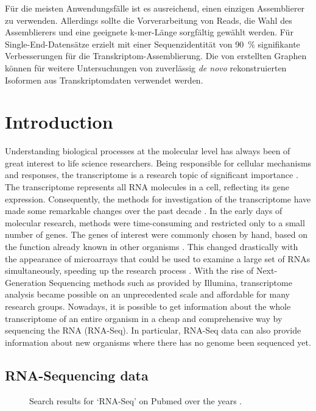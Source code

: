 \documentclass[12pt,a4paper,english]{article}
\begin{document}
	Für die meisten Anwendungsfälle ist es ausreichend, einen einzigen Assemblierer zu verwenden. Allerdings sollte die Vorverarbeitung von Reads, die Wahl des Assemblierers und eine geeignete k-mer-Länge sorgfältig gewählt werden. Für Single-End-Datensätze erzielt \cdhit mit einer Sequenzidentität von 90~\% signifikante Verbesserungen für die Transkriptom-Assemblierung.
	Die von \karma erstellten Graphen können für weitere Untersuchungen von zuverlässig \textit{de novo} rekonstruierten Isoformen aus Transkriptomdaten verwendet werden.
	

\newpage
\pagestyle{empty}
\tableofcontents

\newpage
\pagestyle{fancy}
\renewcommand{\sectionmark}[1]{\markright{#1}}
\section{Introduction}
    Understanding biological processes at the molecular level has always been of great interest to life science researchers.
    Being responsible for cellular mechanisms and responses, the transcriptome is a research topic of significant importance \citep{rnaseq:09}.
	The transcriptome represents all RNA molecules in a cell, reflecting its gene expression. Consequently, the methods for investigation of the transcriptome have made some remarkable changes over the past decade \citep{rev_rnaseq:17}. In the early days of molecular research, methods were time-consuming and restricted only to a small number of genes. The genes of interest were commonly chosen by hand, based on the function already known in other organisms \citep{Fitzpatrick:05}.
	This changed drastically with the appearance of microarrays that could be used to examine a large set of RNAs simultaneously, speeding up the research process \citep{Bhargava:13, Tarca:06}. With the rise of Next-Generation Sequencing methods such as provided by Illumina, transcriptome analysis became possible on an unprecedented scale and affordable for many research groups.
	Nowadays, it is possible to get information about the whole transcriptome of an entire organism in a cheap and comprehensive way by sequencing the RNA (RNA-Seq). In particular, RNA-Seq data can also provide information about new organisms where there has no genome been sequenced yet.
	
	\subsection{RNA-Sequencing data}
	\begin{figure}
		\centering
		\def\svgwidth{0.6\textwidth}
		\vspace{-20pt}
		
		\captionsetup{width=.95\linewidth}
		\caption[Search results for `RNA-Seq' on Pubmed over the years.]{Search results for `RNA-Seq' on Pubmed over the years \citep{growth}.}
		\label{img:growth}
	\end{figure}
\end{document}
